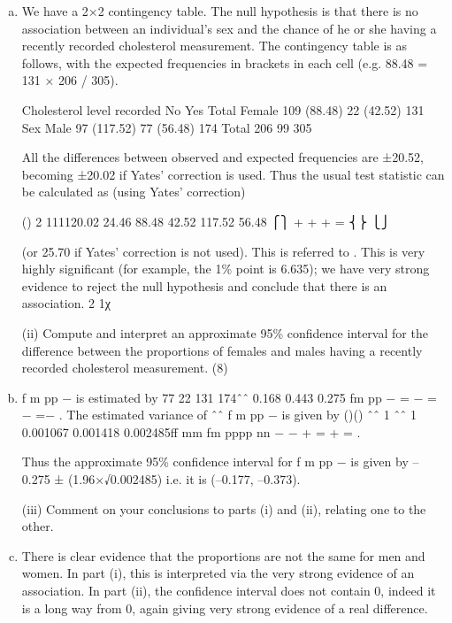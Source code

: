 \documentclass[a4paper,12pt]{article}
\begin{document}
\begin{enumerate}[(a)] 
\item  We have a 2×2 contingency table.  The null hypothesis is that there is no association between an individual's sex and the chance of he or she having a recently recorded cholesterol measurement.  The contingency table is as follows, with the expected frequencies in brackets in each cell (e.g. 88.48 = 131 × 206 / 305). 
 
  Cholesterol level recorded    No Yes Total 
  Female 109     (88.48) 22  (42.52) 131    
  Sex Male   97   (117.52) 77  (56.48) 174  
  Total 206 99 305 
 
All the differences between observed and expected frequencies are ±20.52, becoming ±20.02 if Yates' correction is used.  Thus the usual test statistic can be calculated as (using Yates' correction) 
 
() 2 111120.02 24.46 88.48 42.52 117.52 56.48 ⎧⎫ + + + = ⎨⎬ ⎩⎭
 
 
(or 25.70 if Yates' correction is not used).  This is referred to .  This is very highly significant (for example, the 1\% point is 6.635);  we have very strong evidence to reject the null hypothesis and conclude that there is an association. 2 1χ

\newpage
\begin{framed}
 (ii) Compute and interpret an approximate 95\% confidence interval for the difference between the proportions of females and males having a recently recorded cholesterol measurement. (8) 

\end{framed} 
 
\item f m pp − is estimated by 77 22 131 174ˆˆ 0.168 0.443 0.275 fm pp − = − = − =− .  The estimated variance of ˆˆ f m pp − is given by 
 ()() ˆˆ 1 ˆˆ 1 0.001067 0.001418 0.002485ff mm fm pppp nn − − + = + = . 
 
Thus the approximate 95\% confidence interval for f m pp − is given by –0.275 ± (1.96×√0.002485) i.e. it is (–0.177, –0.373). 

\newpage
\begin{framed}
  
(iii) Comment on your conclusions to parts (i) and (ii), relating one to the other.
\end{framed} 
 
\item There is clear evidence that the proportions are not the same for men and women.  In part (i), this is interpreted via the very strong evidence of an association.  In part (ii), the confidence interval does not contain 0, indeed it is a long way from 0, again giving very strong evidence of a real difference. 
\end{enumerate}
\end{document}
